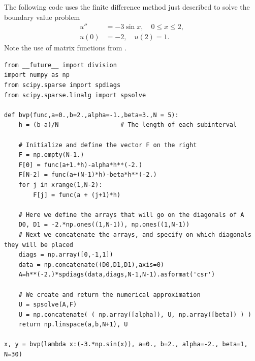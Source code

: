 The following code uses the finite difference method just described to solve the boundary value problem
\begin{align*}
u'' &= -3 \sin{x}, \quad 0 \leq x \leq 2,\\
	u(0) &= -2,\quad u(2) = 1.
\end{align*}
Note the use of matrix functions from . %

\begin{lstlisting}
from __future__ import division
import numpy as np
from scipy.sparse import spdiags
from scipy.sparse.linalg import spsolve

def bvp(func,a=0.,b=2.,alpha=-1.,beta=3.,N = 5):
	h = (b-a)/N 				# The length of each subinterval
	
	# Initialize and define the vector F on the right
	F = np.empty(N-1.)			
	F[0] = func(a+1.*h)-alpha*h**(-2.)
	F[N-2] = func(a+(N-1)*h)-beta*h**(-2.)
	for j in xrange(1,N-2): 
		F[j] = func(a + (j+1)*h)
	
	# Here we define the arrays that will go on the diagonals of A
	D0, D1 = -2.*np.ones((1,N-1)), np.ones((1,N-1))  
	# Next we concatenate the arrays, and specify on which diagonals they will be placed
	diags = np.array([0,-1,1])
	data = np.concatenate((D0,D1,D1),axis=0) 
	A=h**(-2.)*spdiags(data,diags,N-1,N-1).asformat('csr')
	
	# We create and return the numerical approximation
	U = spsolve(A,F)
	U = np.concatenate( ( np.array([alpha]), U, np.array([beta]) ) )
	return np.linspace(a,b,N+1), U

x, y = bvp(lambda x:(-3.*np.sin(x)), a=0., b=2., alpha=-2., beta=1, N=30)
\end{lstlisting}

% 

